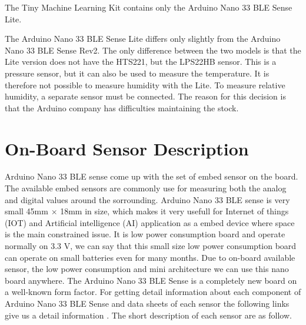 The Tiny Machine Learning Kit contains only the Arduino Nano 33 BLE Sense Lite. 

\bigskip



\bigskip

The Arduino Nano 33 BLE Sense Lite differs only slightly from the Arduino Nano 33 BLE Sense Rev2. The only difference between the two models is that the Lite version does not have the HTS221, but the LPS22HB sensor. This is a pressure sensor, but it can also be used to measure the temperature. It is therefore not possible to measure humidity with the Lite. To measure relative humidity, a separate sensor must be connected. The reason for this decision is that the Arduino company has difficulties maintaining the stock. \cite{Filipi:2022}






\section{On-Board Sensor Description}

Arduino Nano 33 BLE sense come up with the set of embed sensor on the board. The available embed sensors are commonly use for measuring both the analog and digital values around the sorrounding. Arduino Nano 33 BLE sense is very small 45mm $\times$ 18mm in size, which  makes it very usefull for Internet of things (IOT) and Artificial intelligence (AI) application as a embed device where space is the main constrained issue. It is low power consumption board and operate normally on 3.3 V, we can say that this small size low power consumption board can operate on small batteries even for many months. Due to on-board available sensor, the low power consumption and mini architecture we can use this nano board anywhere. The Arduino Nano 33 BLE Sense is a completely new board on a well-known form factor. For getting detail information about each component of Arduino Nano 33 BLE Sense and data sheets of each sensor the following links give us a detail information \cite{Arduino:2021}. The short description of each sensor are as follow. 

